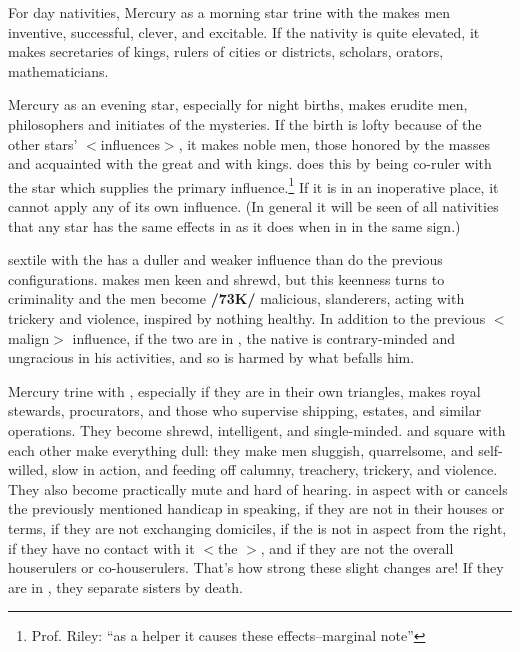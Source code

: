 For day nativities, Mercury \marginnote{\Mercury \Trine \Moon} as a morning star trine with the \Moon\xspace makes men inventive, successful, clever, and excitable. If the nativity is quite elevated, it makes secretaries of kings, rulers of cities or districts, scholars, orators, mathematicians.

Mercury as an evening star, especially for night births, makes erudite men, philosophers and initiates of the mysteries. If the birth is lofty because of the other stars’ $<$influences$>$, it makes noble men, those honored by the masses and acquainted with the great and with kings. \Mercury\xspace does this by being co-ruler with the star which supplies the primary influence.\footnote{Prof. Riley: ``as a helper it causes these effects--marginal note''}
If it is in an inoperative place, it cannot apply any of its own influence. (\mndl In general it will be seen of all nativities that any star has the same effects in \Trine\xspace as it does when in \Conjunction\xspace in the same sign.)

\Mercury\xspace sextile with the \Moon\xspace has a duller and weaker influence than do the previous configurations. \Mercury\xspace \Square\xspace makes men keen and shrewd, but this keenness turns to criminality and the men become \textbf{/73K/} malicious, slanderers, acting with trickery and violence, inspired by nothing healthy. In addition to the previous $<$malign$>$ influence, if the two are in \Opposition, the native is contrary-minded and ungracious in his activities, and so is harmed by what befalls him.

Mercury \marginnote{\Mercury \Trine \Saturn} trine with \Saturn, especially if they are in their own triangles, makes royal stewards, procurators, and those who supervise shipping, estates, and similar operations. They become shrewd,
intelligent, and single-minded. \Mercury\xspace and \Saturn\xspace square with each other make everything dull: they make men sluggish, quarrelsome, and self-willed, slow in action, and feeding off calumny, treachery, trickery, and violence. They also become practically mute and hard of hearing. \Mars\xspace in aspect with \Saturn\xspace
or \Mercury\xspace cancels the previously mentioned handicap in speaking, if they are not in their houses or terms,
if they are not exchanging domiciles, if the \Moon\xspace is not in aspect from the right, if they have no contact with it $<$the \Moon$>$, and if they are not the overall houserulers or co-houserulers. \mndl That’s how strong these slight changes are! If they are in \Opposition, they separate sisters by death.

